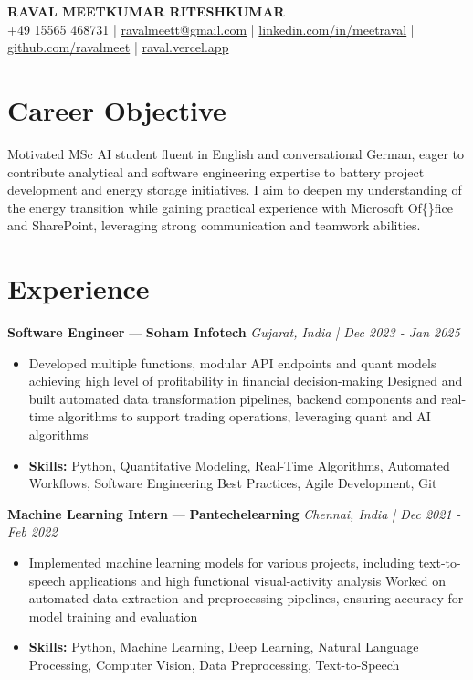 \documentclass[a4paper,10pt]{article}
\begin{document}
\begin{center}
  {\Large\bfseries RAVAL MEETKUMAR RITESHKUMAR}\\[2pt]
  {\small +49 15565 468731 \;|\; \href{mailto:ravalmeett@gmail.com}{ravalmeett@gmail.com} \;|\; \href{https://www.linkedin.com/in/meetraval/}{linkedin.com/in/meetraval} \;|\; \href{https://github.com/ravalmeet}{github.com/ravalmeet} \;|\; \href{https://raval.vercel.app/}{raval.vercel.app}}
\end{center}
\vspace{-3pt}

\section*{Career Objective}
Motivated MSc AI student fluent in English and conversational German, eager to contribute analytical and software engineering expertise to battery project development and energy storage initiatives. I aim to deepen my understanding of the energy transition while gaining practical experience with Microsoft Of\{\}fice and SharePoint, leveraging strong communication and teamwork abilities.\par

\section*{Experience}
\textbf{Software Engineer} — \textbf{Soham Infotech} \hfill \textit{Gujarat, India \;|\; Dec 2023 - Jan 2025}\par
\vspace{1pt}
\begin{itemize}
  \item Developed multiple functions, modular API endpoints and quant models achieving high level of profitability in financial decision-making Designed and built automated data transformation pipelines, backend components and real-time algorithms to support trading operations, leveraging quant and AI algorithms
  \item \textbf{Skills:} Python, Quantitative Modeling, Real-Time Algorithms, Automated Workflows, Software Engineering Best Practices, Agile Development, Git
\end{itemize}
\vspace{3pt}
\textbf{Machine Learning Intern} — \textbf{Pantechelearning} \hfill \textit{Chennai, India \;|\; Dec 2021 - Feb 2022}\par
\vspace{1pt}
\begin{itemize}
  \item Implemented machine learning models for various projects, including text-to-speech applications and high functional visual-activity analysis Worked on automated data extraction and preprocessing pipelines, ensuring accuracy for model training and evaluation
  \item \textbf{Skills:} Python, Machine Learning, Deep Learning, Natural Language Processing, Computer Vision, Data Preprocessing, Text-to-Speech
\end{itemize}
\end{document}
